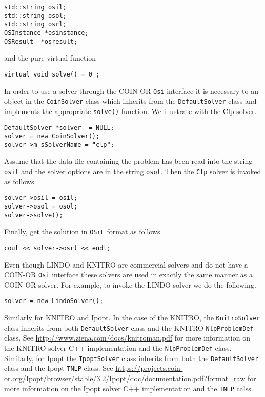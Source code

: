 \documentclass[11pt]{article}
\renewcommand{\_}{{\char"5F}}
\renewcommand{\{}{{\char"7B}}
\renewcommand{\}}{{\char"7D}}
\renewcommand{\^}{{\char"0D}}
\renewcommand{\'}{{\char"0D}}
\begin{document}
\begin{verbatim}
std::string osil;
std::string osol;
std::string osrl;
OSInstance *osinstance;
OSResult  *osresult;
\end{verbatim}
and the pure virtual function
\begin{verbatim}
virtual void solve() = 0 ;	
\end{verbatim}
In order to use a solver through the COIN-OR {\tt Osi} interface it is necessary to an object in the {\tt CoinSolver} class which inherits from the {\tt DefaultSolver} class and implements the appropriate {\tt solve()} function.  We illustrate with the Clp solver.

\begin{verbatim}
DefaultSolver *solver  = NULL;
solver = new CoinSolver();
solver->m_sSolverName = "clp";
\end{verbatim}

Assume that the data file containing the problem has been read into the string {\tt osil} and the solver options are in the string {\tt osol}. Then the {\tt Clp} solver is invoked as follows.

\begin{verbatim}
solver->osil = osil;
solver->osol = osol;
solver->solve();
\end{verbatim}

Finally, get the solution in {\tt OSrL} format as follows

\begin{verbatim}
cout << solver->osrl << endl;
\end{verbatim}

Even though LINDO and KNITRO are commercial solvers and do not have a COIN-OR {\tt Osi} interface these solvers are used in exactly the same manner as a COIN-OR solver. For example, to invoke the LINDO solver we do the following.

\begin{verbatim}
solver = new LindoSolver();	
\end{verbatim}

Similarly for KNITRO and Ipopt. In the case of the KNITRO, the {\tt KnitroSolver} class inherits from both {\tt DefaultSolver} class and the KNITRO {\tt NlpProblemDef} class. See \url{http://www.ziena.com/docs/knitroman.pdf} for more information on the KNITRO solver C++ implementation and the {\tt NlpProblemDef} class. Similarly, for Ipopt the {\tt IpoptSolver} class inherits from both the  {\tt DefaultSolver} class and the Ipopt {\tt TNLP} class.  See \url{https://projects.coin-or.org/Ipopt/browser/stable/3.2/Ipopt/doc/documentation.pdf?format=raw} for more information on the Ipopt solver C++ implementation and the {\tt TNLP} calss.
\end{document}
